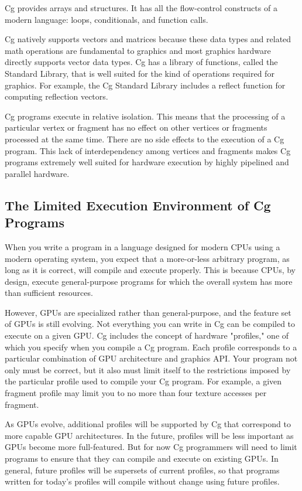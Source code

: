 \documentclass[../main.tex]{subfiles}
\begin{document}
Cg provides arrays and structures. It has all the flow-control constructs of a modern language: loops, conditionals, and function calls.

Cg natively supports vectors and matrices because these data types and related math operations are fundamental to graphics and most graphics hardware directly supports vector data types. Cg has a library of functions, called the Standard Library, that is well suited for the kind of operations required for graphics. For example, the Cg Standard Library includes a reflect function for computing reflection vectors.

Cg programs execute in relative isolation. This means that the processing of a particular vertex or fragment has no effect on other vertices or fragments processed at the same time. There are no side effects to the execution of a Cg program. This lack of interdependency among vertices and fragments makes Cg programs extremely well suited for hardware execution by highly pipelined and parallel hardware.

\subsection{The Limited Execution Environment of Cg Programs}

When you write a program in a language designed for modern CPUs using a modern operating system, you expect that a more-or-less arbitrary program, as long as it is correct, will compile and execute properly. This is because CPUs, by design, execute general-purpose programs for which the overall system has more than sufficient resources.

However, GPUs are specialized rather than general-purpose, and the feature set of GPUs is still evolving. Not everything you can write in Cg can be compiled to execute on a given GPU. Cg includes the concept of hardware "profiles," one of which you specify when you compile a Cg program. Each profile corresponds to a particular combination of GPU architecture and graphics API. Your program not only must be correct, but it also must limit itself to the restrictions imposed by the particular profile used to compile your Cg program. For example, a given fragment profile may limit you to no more than four texture accesses per fragment.

As GPUs evolve, additional profiles will be supported by Cg that correspond to more capable GPU architectures. In the future, profiles will be less important as GPUs become more full-featured. But for now Cg programmers will need to limit programs to ensure that they can compile and execute on existing GPUs. In general, future profiles will be supersets of current profiles, so that programs written for today's profiles will compile without change using future profiles.
\end{document}
